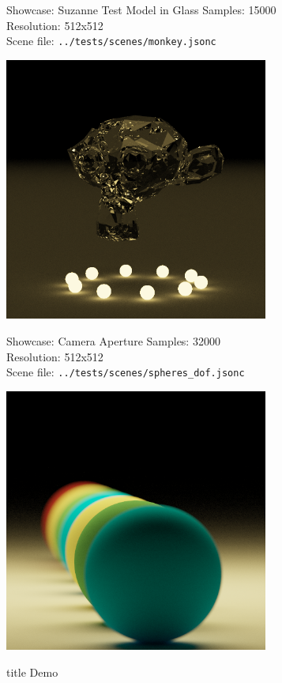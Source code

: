 \documentclass{beamer}
\begin{document}
\begin{frame}{Showcase: Suzanne Test Model in Glass}
    \footnotesize{
    Samples: 15000\\
    Resolution: 512x512\\
    Scene file: \texttt{../tests/scenes/monkey.jsonc}
    }
    \begin{center}
        \includegraphics[width=0.65\textwidth]{../img/suzanne_glass.png}
    \end{center}
\end{frame}

\begin{frame}{Showcase: Camera Aperture}
    \footnotesize{
    Samples: 32000\\
    Resolution: 512x512\\
    Scene file: \texttt{../tests/scenes/spheres\_dof.jsonc}
    }
    \begin{center}
        \includegraphics[width=0.65\textwidth]{../img/dof.png}
    \end{center}
\end{frame}

\begin{frame}
    \vfill
    \centering
    \begin{beamercolorbox}[sep=8pt,center,shadow=true,rounded=true]{title}
        Demo\par
    \end{beamercolorbox}
    \vfill
\end{frame}
\end{document}
